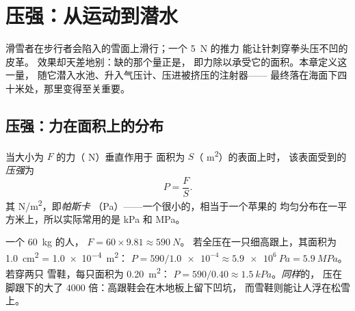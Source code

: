 \chapter{压强：从运动到潜水}\label{ch:g10:pressure}

滑雪者在步行者会陷入的雪面上滑行；一个 \qty{5}{N} 的推力
能让针刺穿拳头压不凹的皮革。
效果却天差地别：缺的那个量正是\emph{}，
即力除以承受它的面积。本章定义这一量，
随它潜入水池、升入气压计、压进被挤压的注射器——
最终落在海面下四十米处，那里变得至关重要。

\section{压强：力在面积上的分布}

\begin{definition}[压强]\label{def:g10:pressure:pressure}
当大小为 $F$ 的力（ \unit{N}）垂直作用于
面积为 $S$（ \unit{m^2}）的表面上时，
该表面受到的\emph{压强}为
\[
P = \frac{F}{S}.
\]
其 \unit{N/m^2}，即\emph{帕斯卡}
（\unit{Pa}）——一个很小的，相当于一个苹果的
均匀分布在一平方米上，所以实际常用的是 \unit{kPa} 和 \unit{MPa}。
\end{definition}

\begin{example}[高跟鞋与雪鞋]\label{ex:g10:pressure:snowshoe}
一个 \qty{60}{kg} 的人， $F = 60 \times 9.81 \approx \qty{590}{N}$。
若全压在一只细高跟上，其面积为 \qty{1.0}{cm^2} = \qty{1.0e-4}{m^2}：
$P = 590/\num{1.0e-4} \approx \qty{5.9e6}{Pa} = \qty{5.9}{MPa}$。若穿两只
雪鞋，每只面积为 \qty{0.20}{m^2}：
$P = 590/0.40 \approx \qty{1.5}{kPa}$。\emph{同样}的，
压在脚跟下的大了 $4000$ 倍：高跟鞋会在木地板上留下凹坑，
而雪鞋则能让人浮在松雪上。
\end{example}


